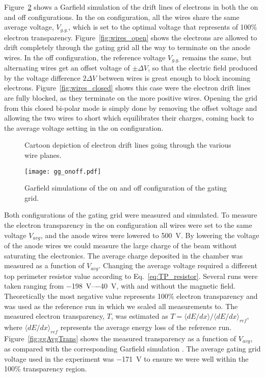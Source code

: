 Figure~\ref{fig:gg_onoff} shows a Garfield simulation of the drift lines of electrons in both the on and off configurations. In the on configuration, all the wires share the same average voltage, $V_{g.g.}$, which is set to the optimal voltage that represents of 100\% electron transparency. Figure~\ref{fig:wires_open} shows the electrons are allowed to drift completely through the gating grid all the way to terminate on the anode wires. In the off configuration, the reference voltage $V_{g.g.}$ remains the same, but alternating wires get an offset voltage of $\pm \Delta V$, so that the electric field produced by the voltage difference $2\Delta V$ between wires is great enough to block incoming electrons. Figure~\ref{fig:wires_closed} shows this case were the electron drift lines are fully blocked, as they terminate on the more positive wires. Opening the grid from this closed bi-polar mode is simply done by removing the offset voltage and allowing the two wires to short which equilibrates their charges, coming back to the average voltage setting in the on configuration.

\begin{figure}[!htb]%
    \centering
    \qquad
    \caption{Cartoon depiction of electron drift lines going through the various wire planes.}%
    \label{fig:wires}%
\end{figure}

\begin{figure}[!htb]
\centering
\texttt{[image: gg\_onoff.pdf]}
\caption{Garfield simulations of the on and off configuration of the gating grid.}
\label{fig:gg_onoff}
\end{figure}


Both configurations of the gating grid were measured and simulated. To measure the electron transparency in the on configuration all wires were set to the same voltage $V_{avg}$, and the anode wires were lowered to \SI{500}{\volt}. By lowering the voltage of the anode wires we could measure the large charge of the beam without saturating the electronics. The average charge deposited in the chamber was measured as a function of $V_{avg}$. Changing the average voltage required a different top perimeter resistor value according to Eq.~\ref{eq:TP_resistor}. Several runs were taken ranging from \SIrange{-198}{-40}{\volt}, with and without the magnetic field. Theoretically the most negative value represents 100\% electron transparency and was used as the reference run in which we scaled all measurements to. The measured electron transparency, $T$, was estimated as $T = \langle dE/dx\rangle/{\langle dE/dx\rangle}_{ref}$, where $\langle dE/dx\rangle_{ref}$ represents the average energy loss of the reference run. Figure~\ref{fig:ggAvgTrans} shows the measured transparency as a function of $V_{avg}$, as compared with the corresponding Garfield simulation \cite{garfield++}. The average gating grid voltage used in the experiment was \SI{-171}{\volt} to ensure we were well within the 100\% transparency region. 


